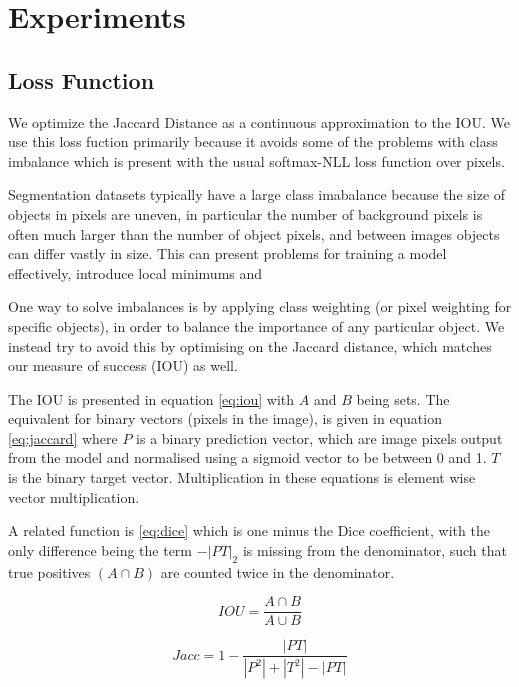 \documentclass{article}
\begin{document}
\section {Experiments}


\subsection {Loss Function}

We optimize the Jaccard Distance as a continuous approximation to the \gls{IOU}. We use this loss fuction primarily because it avoids some of the problems with class imbalance which is present with the usual softmax-\gls{NLL} loss function over pixels. 

Segmentation datasets typically have a large class imabalance because the size of objects in pixels are uneven, in particular the number of background pixels is often much larger than the number of object pixels, and between images objects can differ vastly in size. This can present problems for training a model effectively, introduce local minimums and 

One way to solve imbalances is by applying class weighting (or pixel weighting for specific objects), in order to balance the importance of any particular object. We instead try to avoid this by optimising on the Jaccard distance, which matches our measure of success (\gls{IOU}) as well.


The \gls{IOU} is presented in equation \ref{eq:iou} with $ A $ and $ B $ being sets. The equivalent for binary vectors (pixels in the image), is given in equation \ref{eq:jaccard} where $ P $ is a binary prediction vector, which are image pixels output from the model and normalised using a sigmoid vector to be between 0 and 1. $ T $ is the binary target vector. Multiplication in these equations is element wise vector multiplication.

A related function is \ref{eq:dice} which is one minus the Dice coefficient, with the only difference being the term $ - | PT |_2 $ is missing from the denominator, such that true positives $ (A \cap B) $ are counted twice in the denominator.

\begin{equation}
IOU = \frac{A \cap B}{A \cup B}
\label{eq:iou}
\end{equation}



\begin{equation}
Jacc = 1 - \frac{| PT |}{| P^2 | + | T^2 | - | PT |}
\label{eq:jaccard}
\end{equation}
\end{document}
